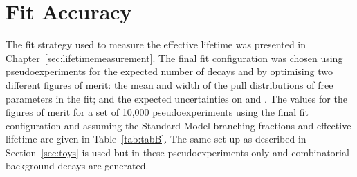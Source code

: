 \section{Fit Accuracy}
\label{sec:fitaccuracy}
The fit strategy used to measure the \bsmumu effective lifetime was presented in Chapter~\ref{sec:lifetimemeasurement}. The final fit configuration was chosen using pseudoexperiments for the expected number of decays and by optimising two different figures of merit: the mean and width of the pull distributions of free parameters in the fit; and the expected uncertainties on \tmumu and \Gmumu. The values for the figures of merit for a set of 10,000 pseudoexperiments using the final fit configuration and assuming the Standard Model \bmumu branching fractions and effective lifetime are given in Table~\ref{tab:tabB}. The same set up as described in Section~\ref{sec:toys} is used but in these pseudoexperiments only \bsmumu and combinatorial background decays are generated. 
